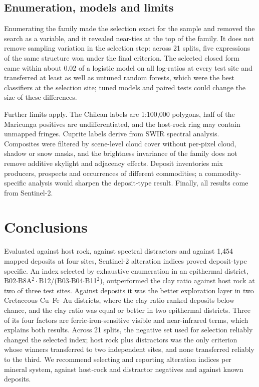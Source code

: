 \documentclass[preprint,authoryear,number]{elsarticle}
\begin{document}
\subsection{Enumeration, models and limits}

Enumerating the family made the selection exact for the sample and removed the search as a variable, and it revealed near-ties at the top of the family. It does not remove sampling variation in the selection step: across 21 splits, five expressions of the same structure won under the final criterion. The selected closed form came within about 0.02 of a logistic model on all log-ratios at every test site and transferred at least as well as untuned random forests, which were the best classifiers at the selection site; tuned models and paired tests could change the size of these differences.

Further limits apply. The Chilean labels are 1:100{,}000 polygons, half of the Maricunga positives are undifferentiated, and the host-rock ring may contain unmapped fringes. Cuprite labels derive from SWIR spectral analysis. Composites were filtered by scene-level cloud cover without per-pixel cloud, shadow or snow masks, and the brightness invariance of the family does not remove additive skylight and adjacency effects. Deposit inventories mix producers, prospects and occurrences of different commodities; a commodity-specific analysis would sharpen the deposit-type result. Finally, all results come from Sentinel-2.

\section{Conclusions}
\label{sec:conclusions}

Evaluated against host rock, against spectral distractors and against 1{,}454 mapped deposits at four sites, Sentinel-2 alteration indices proved deposit-type specific. An index selected by exhaustive enumeration in an epithermal district, B02$\cdot$B8A$^2\cdot$B12/(B03$\cdot$B04$\cdot$B11$^2$), outperformed the clay ratio against host rock at two of three test sites. Against deposits it was the better exploration layer in two Cretaceous Cu--Fe--Au districts, where the clay ratio ranked deposits below chance, and the clay ratio was equal or better in two epithermal districts. Three of its four factors are ferric-iron-sensitive visible and near-infrared terms, which explains both results. Across 21 splits, the negative set used for selection reliably changed the selected index; host rock plus distractors was the only criterion whose winners transferred to two independent sites, and none transferred reliably to the third. We recommend selecting and reporting alteration indices per mineral system, against host-rock and distractor negatives and against known deposits.
\end{document}
